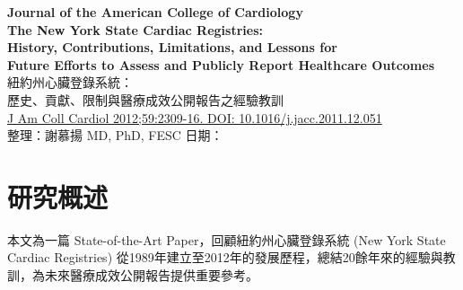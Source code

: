\documentclass[12pt,a4paper]{article}
\begin{document}

\begin{center}
{\LARGE\bfseries\textcolor{emergency_red}{Journal of the American College of Cardiology}}\\[0.5cm]
{\Large\textbf{The New York State Cardiac Registries:\\
History, Contributions, Limitations, and Lessons for\\
Future Efforts to Assess and Publicly Report Healthcare Outcomes}}\\[0.3cm]
{\large 紐約州心臟登錄系統：\\
歷史、貢獻、限制與醫療成效公開報告之經驗教訓}\\[0.5cm]
{\normalsize \href{https://doi.org/10.1016/j.jacc.2011.12.051}{J Am Coll Cardiol 2012;59:2309-16. DOI: 10.1016/j.jacc.2011.12.051}}\\[0.3cm]
{\normalsize 整理：謝慕揚 MD, PhD, FESC \quad 日期：\mydate}
\end{center}

\vspace{0.5cm}



\tableofcontents
\newpage

\section{研究概述}

本文為一篇 State-of-the-Art Paper，回顧紐約州心臟登錄系統 (New York State Cardiac Registries) 從1989年建立至2012年的發展歷程，總結20餘年來的經驗與教訓，為未來醫療成效公開報告提供重要參考。
\end{document}
